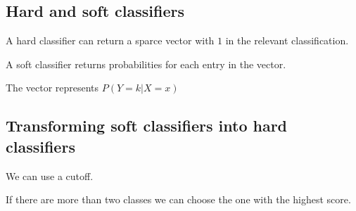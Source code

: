 
\subsection{Hard and soft classifiers}

A hard classifier can return a sparce vector with \(1\) in the relevant classification.

A soft classifier returns probabilities for each entry in the vector.

The vector represents  \(P(Y=k|X=x)\)

\subsection{Transforming soft classifiers into hard classifiers}

We can use a cutoff.

If there are more than two classes we can choose the one with the highest score.

